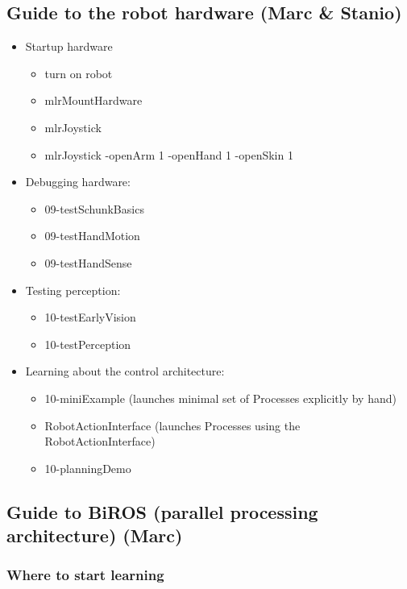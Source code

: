 \subsection{Guide to the robot hardware (Marc \& Stanio)}

\begin{itemize}
\item Startup hardware
\begin{itemize}
\item turn on robot
\item mlrMountHardware
\item mlrJoystick
\item mlrJoystick -openArm 1 -openHand 1 -openSkin 1
\end{itemize}

\item Debugging hardware:
\begin{itemize}
\item 09-testSchunkBasics
\item 09-testHandMotion
\item 09-testHandSense
\end{itemize}

\item Testing perception:
\begin{itemize}
\item 10-testEarlyVision
\item 10-testPerception
\end{itemize}

\item Learning about the control architecture:
\begin{itemize}
\item 10-miniExample (launches minimal set of Processes explicitly by hand)
\item RobotActionInterface (launches Processes using the RobotActionInterface)
\item 10-planningDemo
\end{itemize}
\end{itemize}


\subsection{Guide to BiROS (parallel processing architecture) (Marc)}


\subsubsection{Where to start learning}


